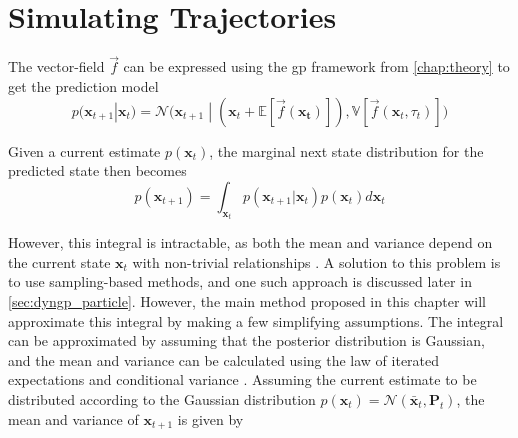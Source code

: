 \section{Simulating Trajectories}

The vector-field $\vec{f}$ can be expressed using the \acrshort{gp} framework from \cref{chap:theory} to get the prediction model
\begin{equation}\label{eq:dyngp_predictive_distribution}
    p(\boldsymbol{x}_{t+1} | \boldsymbol{x}_t) = \mathcal{N}\big(\boldsymbol{x}_{t+1} \; | \; (\boldsymbol{x}_t + \mathbb{E}[\vec{f}(\boldsymbol{x_t})]), \mathbb{V}[\vec{f}(\boldsymbol{x}_t, \tau_t)] \big)
\end{equation}

Given a current estimate $p(\boldsymbol{x}_t)$, the marginal next state distribution for the predicted state then becomes
\begin{equation}\label{eq:dyngp_true_posterior}
    p(\boldsymbol{x}_{t+1}) = \int_{\boldsymbol{x}_t} p(\boldsymbol{x}_{t+1} | \boldsymbol{x}_t) p(\boldsymbol{x}_t) d\boldsymbol{x}_t
\end{equation}

However, this integral is intractable, as both the mean and variance depend on the current state $\boldsymbol{x}_t$ with non-trivial relationships \cite{pedestrian,multistep_gp}. A solution to this problem is to use sampling-based methods, and one such approach is discussed later in \cref{sec:dyngp_particle}.
However, the main method proposed in this chapter will approximate this integral by making a few simplifying assumptions. The integral can be approximated by assuming that the posterior distribution is Gaussian, and the mean and variance can be calculated using the law of iterated expectations and conditional variance \cite{multistep_gp}. Assuming the current estimate to be distributed according to the Gaussian distribution $p(\boldsymbol{x}_t) = \mathcal{N}(\bar{\boldsymbol{x}}_t, \boldsymbol{P}_t)$, the mean and variance of $\boldsymbol{x}_{t+1}$ is given by

